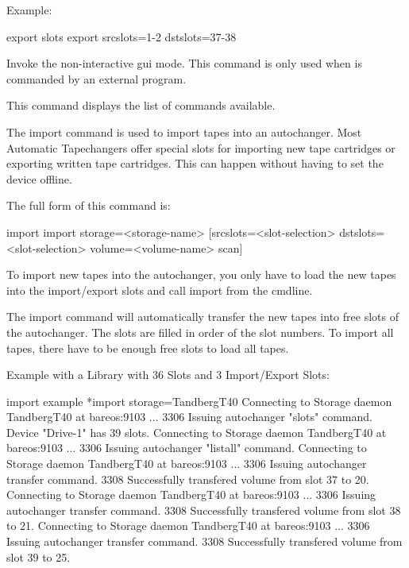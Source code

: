 \begin{description}
   Example:

\begin{bconsole}{export slots}
export srcslots=1-2 dstslots=37-38
\end{bconsole}

\item [gui]
    Invoke the non-interactive gui mode.
    This command is only used when  is commanded by an external program.

\item [help]
   This command displays the list of commands available.

\item [import]
   The import command is used to import tapes into an autochanger. Most Automatic
   Tapechangers offer special slots for importing new tape cartridges or
   exporting written tape cartridges. This can happen without having to set
   the device offline.

   The full form of this command is:

\begin{bconsole}{import}
import storage=<storage-name> [srcslots=<slot-selection> dstslots=<slot-selection> volume=<volume-name> scan]
\end{bconsole}

   To import new tapes into the autochanger, you only have to load the new
   tapes into the import/export slots and call import from the cmdline.

   The import command will automatically transfer the new tapes into free
   slots of the autochanger. The slots are filled in order of the slot numbers.
   To import all tapes, there have to be enough free slots to load all tapes.

   Example with a Library with 36 Slots and 3 Import/Export Slots:

\begin{bconsole}{import example}
*import storage=TandbergT40
Connecting to Storage daemon TandbergT40 at bareos:9103 ...
3306 Issuing autochanger "slots" command.
Device "Drive-1" has 39 slots.
Connecting to Storage daemon TandbergT40 at bareos:9103 ...
3306 Issuing autochanger "listall" command.
Connecting to Storage daemon TandbergT40 at bareos:9103 ...
3306 Issuing autochanger transfer command.
3308 Successfully transfered volume from slot 37 to 20.
Connecting to Storage daemon TandbergT40 at bareos:9103 ...
3306 Issuing autochanger transfer command.
3308 Successfully transfered volume from slot 38 to 21.
Connecting to Storage daemon TandbergT40 at bareos:9103 ...
3306 Issuing autochanger transfer command.
3308 Successfully transfered volume from slot 39 to 25.
\end{bconsole}


\end{description}

